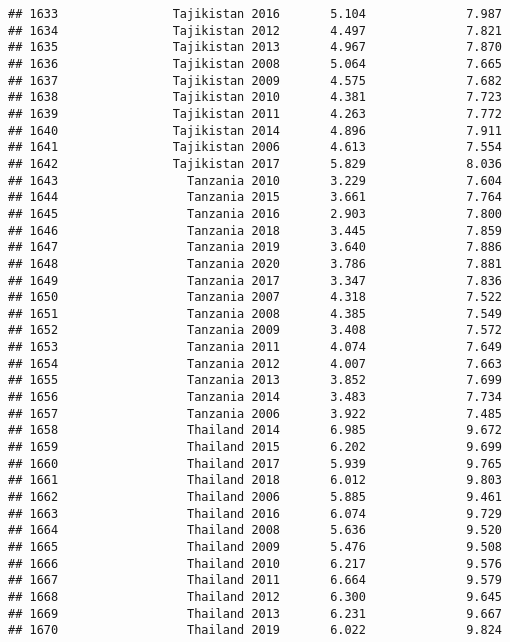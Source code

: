 \documentclass[
]{article}
\begin{document}
\begin{verbatim}
## 1633                Tajikistan 2016       5.104              7.987
## 1634                Tajikistan 2012       4.497              7.821
## 1635                Tajikistan 2013       4.967              7.870
## 1636                Tajikistan 2008       5.064              7.665
## 1637                Tajikistan 2009       4.575              7.682
## 1638                Tajikistan 2010       4.381              7.723
## 1639                Tajikistan 2011       4.263              7.772
## 1640                Tajikistan 2014       4.896              7.911
## 1641                Tajikistan 2006       4.613              7.554
## 1642                Tajikistan 2017       5.829              8.036
## 1643                  Tanzania 2010       3.229              7.604
## 1644                  Tanzania 2015       3.661              7.764
## 1645                  Tanzania 2016       2.903              7.800
## 1646                  Tanzania 2018       3.445              7.859
## 1647                  Tanzania 2019       3.640              7.886
## 1648                  Tanzania 2020       3.786              7.881
## 1649                  Tanzania 2017       3.347              7.836
## 1650                  Tanzania 2007       4.318              7.522
## 1651                  Tanzania 2008       4.385              7.549
## 1652                  Tanzania 2009       3.408              7.572
## 1653                  Tanzania 2011       4.074              7.649
## 1654                  Tanzania 2012       4.007              7.663
## 1655                  Tanzania 2013       3.852              7.699
## 1656                  Tanzania 2014       3.483              7.734
## 1657                  Tanzania 2006       3.922              7.485
## 1658                  Thailand 2014       6.985              9.672
## 1659                  Thailand 2015       6.202              9.699
## 1660                  Thailand 2017       5.939              9.765
## 1661                  Thailand 2018       6.012              9.803
## 1662                  Thailand 2006       5.885              9.461
## 1663                  Thailand 2016       6.074              9.729
## 1664                  Thailand 2008       5.636              9.520
## 1665                  Thailand 2009       5.476              9.508
## 1666                  Thailand 2010       6.217              9.576
## 1667                  Thailand 2011       6.664              9.579
## 1668                  Thailand 2012       6.300              9.645
## 1669                  Thailand 2013       6.231              9.667
## 1670                  Thailand 2019       6.022              9.824

\end{verbatim}
\end{document}
